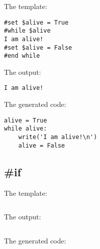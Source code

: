 The template:
\begin{verbatim}
#set $alive = True
#while $alive
I am alive!
#set $alive = False
#end while
\end{verbatim}

The output:
\begin{verbatim}
I am alive!
\end{verbatim}

The generated code:
\begin{verbatim}
alive = True
while alive:
    write('I am alive!\n')
    alive = False
\end{verbatim}

\subsection{\#if}
\label{}

The template:
\begin{verbatim}
\end{verbatim}

The output:
\begin{verbatim}
\end{verbatim}

The generated code:
\begin{verbatim}
\end{verbatim}




